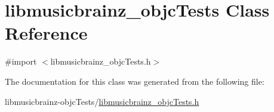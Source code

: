 \hypertarget{interfacelibmusicbrainz__objc_tests}{\section{libmusicbrainz\-\_\-objc\-Tests Class Reference}
\label{interfacelibmusicbrainz__objc_tests}
}


{\ttfamily \#import $<$libmusicbrainz\-\_\-objc\-Tests.\-h$>$}



The documentation for this class was generated from the following file\-:\begin{DoxyCompactItemize}
\item 
libmusicbrainz-\/objc\-Tests/\hyperlink{libmusicbrainz__objc_tests_8h}{libmusicbrainz\-\_\-objc\-Tests.\-h}\end{DoxyCompactItemize}
